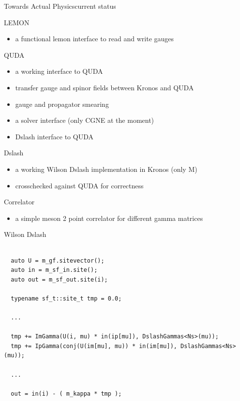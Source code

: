 \begin{frame}{Towards Actual Physics}{current status}

  \begin{bkblock}{LEMON}
    \begin{itemize}
      \item a functional lemon interface to read and write gauges
    \end{itemize}
  \end{bkblock}

  \begin{bkalertblock}{QUDA}
    \begin{itemize}
      \item a working interface to QUDA
      \item transfer gauge and spinor fields between Kronos and QUDA
      \item gauge and propagator smearing
      \item a solver interface (only CGNE at the moment)
      \item Dslash interface to QUDA
    \end{itemize}
  \end{bkalertblock}

  \begin{bkexampleblock}{Dslash}
    \begin{itemize}
      \item a working Wilson Dslash implementation in Kronos (only M)
      \item crosschecked against QUDA for correctness
    \end{itemize}
  \end{bkexampleblock}

  \begin{bkblock}{Correlator}
    \begin{itemize}
      \item a simple meson 2 point correlator for different gamma matrices
    \end{itemize}
  \end{bkblock}

\end{frame}

\begin{frame}[fragile]{Wilson Dslash}
  
  \begin{verbatim}

  auto U = m_gf.sitevector();
  auto in = m_sf_in.site();
  auto out = m_sf_out.site(i);

  typename sf_t::site_t tmp = 0.0;
  
  ...

  tmp += ImGamma(U(i, mu) * in(ip[mu]), DslashGammas<Ns>(mu));
  tmp += IpGamma(conj(U(im[mu], mu)) * in(im[mu]), DslashGammas<Ns>(mu));

  ...

  out = in(i) - ( m_kappa * tmp );

  \end{verbatim}

\end{frame}

